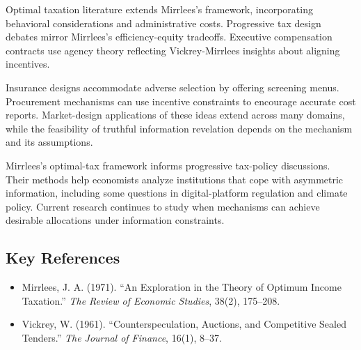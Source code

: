 Optimal taxation literature extends Mirrlees's framework, incorporating behavioral
considerations and administrative costs. Progressive tax design debates mirror
Mirrlees's efficiency-equity tradeoffs. Executive compensation contracts use
agency theory reflecting Vickrey-Mirrlees insights about aligning incentives.

Insurance designs accommodate adverse selection by offering screening menus.
Procurement mechanisms can use incentive constraints to encourage accurate cost
reports. Market-design applications of these ideas extend across many domains,
while the feasibility of truthful information revelation depends on the mechanism
and its assumptions.

Mirrlees's optimal-tax framework informs progressive tax-policy discussions.
Their methods help economists analyze institutions that cope with asymmetric
information, including some questions in digital-platform regulation and climate
policy. Current research continues to study when mechanisms can achieve desirable
allocations under information constraints.

\subsection*{Key References}
\begin{itemize}
    \item Mirrlees, J. A. (1971). ``An Exploration in the Theory of Optimum Income Taxation.'' \textit{The Review of Economic Studies}, 38(2), 175--208.
    \item Vickrey, W. (1961). ``Counterspeculation, Auctions, and Competitive Sealed Tenders.'' \textit{The Journal of Finance}, 16(1), 8--37.
\end{itemize}

